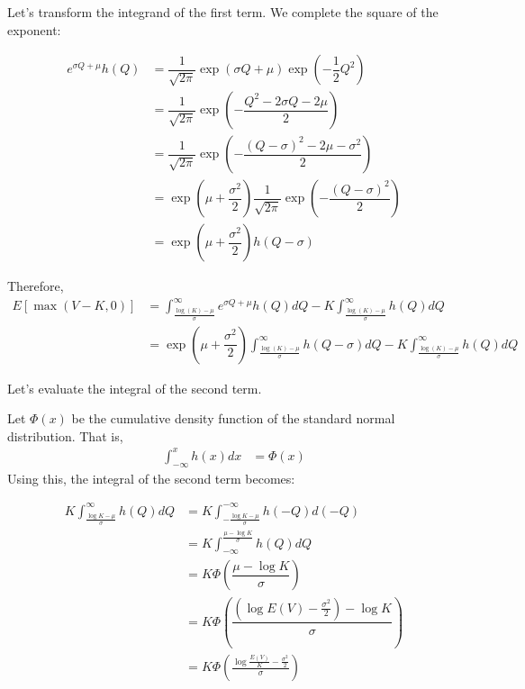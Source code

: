 \documentclass[uplatex]{jsarticle}
\begin{document}
Let's transform the integrand of the first term. We complete the square of the exponent:

\begin{align}
	e^{\sigma Q + \mu } h(Q) & = \dfrac{1}{\sqrt{2 \pi}} \exp(\sigma Q + \mu ) \exp(-\dfrac{1}{2} Q^{2})                           \\
	                         & = \dfrac{1}{\sqrt{2 \pi}} \exp( -\dfrac{ Q^{2} - 2 \sigma Q - 2 \mu }{2})                           \\
	                         & = \dfrac{1}{\sqrt{2 \pi}} \exp( -\dfrac{ (Q - \sigma)^{2} - 2 \mu - \sigma^{2} }{2})                \\
	                         & = \exp( \mu + \dfrac{\sigma^{2} }{2}) \dfrac{1}{\sqrt{2 \pi}} \exp( -\dfrac{ (Q - \sigma)^{2} }{2}) \\
	                         & = \exp( \mu + \dfrac{\sigma^{2} }{2}) h(Q - \sigma)
\end{align}

Therefore,
\begin{align}
	E \left[ \max(V-K,0) \right] & = \int^{\infty}_{\frac{\log(K) - \mu}{\sigma}} e^{\sigma Q + \mu } h(Q) dQ - K \int^{\infty}_{\frac{\log(K) - \mu}{\sigma}} h(Q) dQ                          \\
	                             & = \exp( \mu + \dfrac{\sigma^{2} }{2}) \int^{\infty}_{\frac{\log(K) - \mu}{\sigma}} h(Q - \sigma) dQ - K \int^{\infty}_{\frac{\log(K) - \mu}{\sigma}} h(Q) dQ
\end{align}

Let's evaluate the integral of the second term.

Let $\Phi (x)$ be the cumulative density function of the standard normal distribution. That is,
\begin{align}
	\int^{x}_{-\infty} h(x) dx & = \Phi (x)
\end{align}
Using this, the integral of the second term becomes:

\begin{align}
	K \int^{\infty}_{\frac{\log K - \mu}{\sigma}} h(Q) dQ & = K \int_{-\frac{\log K - \mu}{\sigma}}^{-\infty} h(-Q) d(-Q)                                      \\
	                                                      & = K \int^{\frac{ \mu - \log K }{\sigma}}_{-\infty} h(Q) dQ                                         \\
	                                                      & = K \Phi \left( \dfrac{ \mu - \log K }{\sigma} \right)                                             \\
	                                                      & = K \Phi \left( \dfrac{ \left( \log E(V) - \frac{\sigma^{2}}{2} \right) - \log K }{\sigma} \right) \\
	                                                      & = K \Phi \left( \frac{\log\frac{E(V)}{K} - \frac{\sigma^{2}}{2} }{\sigma} \right)
\end{align}
\end{document}
